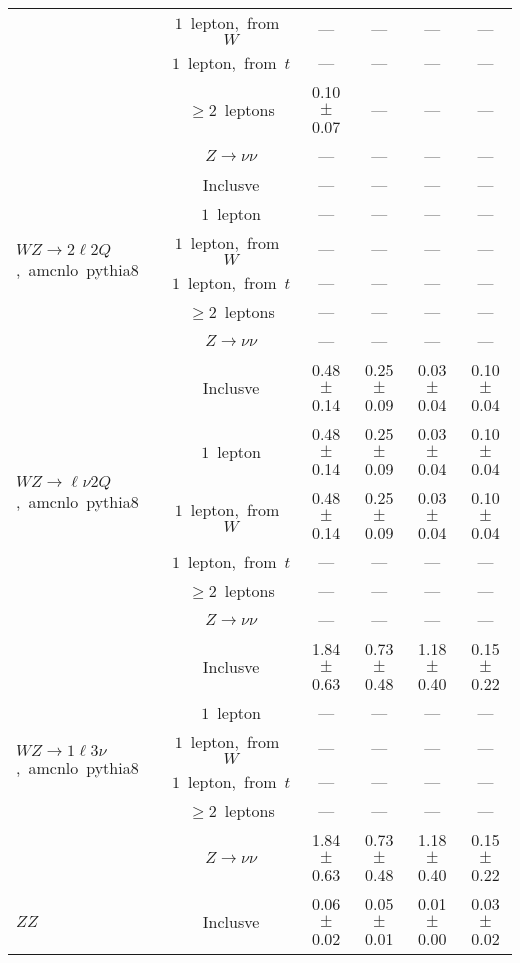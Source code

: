 \documentclass{article}
\begin{document}
\begin{longtable}{|l|c|c|c|c|c|}
 & $1$~lepton,~from~$W$  & ---  & ---  & ---  & --- \\* 
 & $1$~lepton,~from~$t$  & ---  & ---  & ---  & --- \\* 
 & $\ge2$~leptons  & 0.10 $\pm$ 0.07  & ---  & ---  & --- \\* 
 & $Z\rightarrow\nu\nu$  & ---  & ---  & ---  & --- \\* 
\hline 
\multirow{6}{*}{$WZ{\rightarrow}2{\ell}2Q$,~amcnlo~pythia8} & Inclusve  & ---  & ---  & ---  & --- \\* 
 & $1$~lepton  & ---  & ---  & ---  & --- \\* 
 & $1$~lepton,~from~$W$  & ---  & ---  & ---  & --- \\* 
 & $1$~lepton,~from~$t$  & ---  & ---  & ---  & --- \\* 
 & $\ge2$~leptons  & ---  & ---  & ---  & --- \\* 
 & $Z\rightarrow\nu\nu$  & ---  & ---  & ---  & --- \\* 
\hline 
\multirow{6}{*}{$WZ{\rightarrow}{\ell}{\nu}2Q$,~amcnlo~pythia8} & Inclusve  & 0.48 $\pm$ 0.14  & 0.25 $\pm$ 0.09  & 0.03 $\pm$ 0.04  & 0.10 $\pm$ 0.04 \\* 
 & $1$~lepton  & 0.48 $\pm$ 0.14  & 0.25 $\pm$ 0.09  & 0.03 $\pm$ 0.04  & 0.10 $\pm$ 0.04 \\* 
 & $1$~lepton,~from~$W$  & 0.48 $\pm$ 0.14  & 0.25 $\pm$ 0.09  & 0.03 $\pm$ 0.04  & 0.10 $\pm$ 0.04 \\* 
 & $1$~lepton,~from~$t$  & ---  & ---  & ---  & --- \\* 
 & $\ge2$~leptons  & ---  & ---  & ---  & --- \\* 
 & $Z\rightarrow\nu\nu$  & ---  & ---  & ---  & --- \\* 
\hline 
\multirow{6}{*}{$WZ{\rightarrow}1{\ell}3{\nu}$,~amcnlo~pythia8} & Inclusve  & 1.84 $\pm$ 0.63  & 0.73 $\pm$ 0.48  & 1.18 $\pm$ 0.40  & 0.15 $\pm$ 0.22 \\* 
 & $1$~lepton  & ---  & ---  & ---  & --- \\* 
 & $1$~lepton,~from~$W$  & ---  & ---  & ---  & --- \\* 
 & $1$~lepton,~from~$t$  & ---  & ---  & ---  & --- \\* 
 & $\ge2$~leptons  & ---  & ---  & ---  & --- \\* 
 & $Z\rightarrow\nu\nu$  & 1.84 $\pm$ 0.63  & 0.73 $\pm$ 0.48  & 1.18 $\pm$ 0.40  & 0.15 $\pm$ 0.22 \\* 
\hline 
\multirow{6}{*}{$ZZ$} & Inclusve  & 0.06 $\pm$ 0.02  & 0.05 $\pm$ 0.01  & 0.01 $\pm$ 0.00  & 0.03 $\pm$ 0.02 \\* 

\end{longtable}
\end{document}
